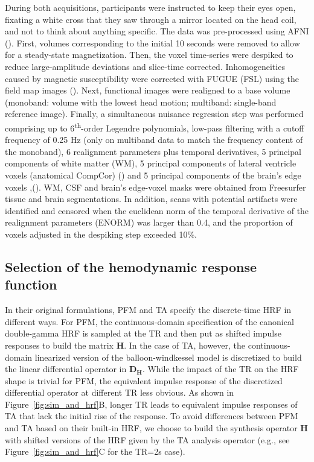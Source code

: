 During both acquisitions, participants were instructed to keep their eyes open, fixating a white cross that they saw through a mirror located on the head coil, and not to think about anything specific. The data was pre-processed using AFNI (\citealt{Cox1996AFNISoftwareAnalysis}). First, volumes corresponding to the initial 10 seconds were removed to allow for a steady-state magnetization. Then, the voxel time-series were despiked to reduce large-amplitude deviations and slice-time corrected. Inhomogeneities caused by magnetic susceptibility were corrected with FUGUE (FSL) using the field map images (\citealt{Jenkinson2012FSL}). Next, functional images were realigned to a base volume (monoband: volume with the lowest head motion; multiband: single-band reference image). Finally, a simultaneous nuisance regression step was performed comprising up to 6\textsuperscript{th}-order Legendre polynomials, low-pass filtering with a cutoff frequency of 0.25 Hz (only on multiband data to match the frequency content of the monoband), 6 realignment parameters plus temporal derivatives, 5 principal components of white matter (WM), 5 principal components of lateral ventricle voxels (anatomical CompCor) (\citealt{Behzadi_2007}) and 5 principal components of the brain's edge voxels ,(\citealt{Patriat_2015}). WM, CSF and brain's edge-voxel masks were obtained from Freesurfer tissue and brain segmentations. In addition, scans with potential artifacts were identified and censored when the euclidean norm of the temporal derivative of the realignment parameters (ENORM) was larger than 0.4, and the proportion of voxels adjusted in the despiking step exceeded 10\%.

\subsection{Selection of the hemodynamic response function}

In their original formulations, PFM and TA specify the discrete-time HRF in different ways. For PFM, the continuous-domain specification of the canonical double-gamma HRF is sampled at the TR and then put as shifted impulse responses to build the matrix $\mathbf{H}$.  In the case of TA, however, the continuous-domain linearized version of the balloon-windkessel model is discretized to build the linear differential operator in $\mathbf{D_H}$. While the impact of the TR on the HRF shape is trivial for PFM, the equivalent impulse response of the discretized differential operator at different TR less obvious. As shown in Figure~\ref{fig:sim_and_hrf}B, longer TR leads to equivalent impulse responses of TA that lack the initial rise of the response. To avoid differences between PFM and TA based on their built-in HRF, we choose to build the synthesis operator $\mathbf{H}$ with shifted versions of the HRF given by the TA analysis operator (e.g., see Figure~\ref{fig:sim_and_hrf}C for the TR=2s case).

